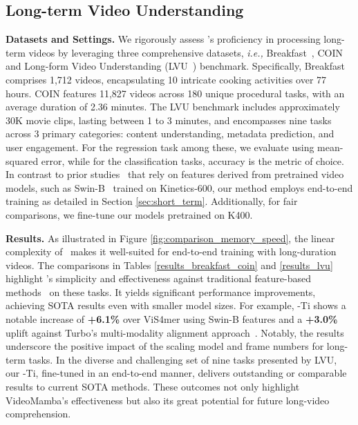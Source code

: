 





\subsection{Long-term Video Understanding}






\noindent\textbf{Datasets and Settings.} 
We rigorously assess \ModelName's proficiency in processing long-term videos by leveraging three comprehensive datasets,
\textit{i.e.,}
Breakfast~\cite{breakfast}, COIN~\cite{coin} and Long-form Video Understanding (LVU~\cite{lvu}) benchmark. 
Specifically,
Breakfast comprises 1,712 videos, 
encapsulating 10 intricate cooking activities over 77 hours. 
COIN features 11,827 videos across 180 unique procedural tasks, 
with an average duration of 2.36 minutes. 
The LVU benchmark includes approximately 30K movie clips, 
lasting between 1 to 3 minutes, 
and encompasses nine tasks across 3 primary categories: 
content understanding, metadata prediction, and user engagement. 
For the regression task among these, we evaluate using mean-squared error, 
while for the classification tasks, accuracy is the metric of choice.
In contrast to prior studies~\cite{distant,vis4mer} that rely on features derived from pretrained video models, 
such as Swin-B~\cite{swin} trained on Kinetics-600, 
our method employs end-to-end training as detailed in Section \ref{sec:short_term}. 
Additionally, 
for fair comparisons, 
we fine-tune our models pretrained on K400.

\vspace{0.05cm}
\noindent\textbf{Results.} 
As illustrated in Figure \ref{fig:comparison_memory_speed}, 
the linear complexity of \ModelName\  makes it well-suited for end-to-end training with long-duration videos.
The comparisons in Tables \ref{results_breakfast_coin} and \ref{results_lvu} highlight \ModelName's simplicity and effectiveness against traditional feature-based methods~\cite{vis4mer,distant} on these tasks. 
It yields significant performance improvements, 
achieving SOTA results even with smaller model sizes.
For example, 
\ModelName-Ti shows a notable increase of \textbf{+6.1\%} over ViS4mer using Swin-B features and a \textbf{+3.0\%} uplift against Turbo's multi-modality alignment approach~\cite{turbo}. 
Notably, 
the results underscore the positive impact of the scaling model and frame numbers for long-term tasks. 
In the diverse and challenging set of nine tasks presented by LVU, 
our \ModelName-Ti, fine-tuned in an end-to-end manner, 
delivers outstanding or comparable results to current SOTA methods. 
These outcomes not only highlight VideoMamba's effectiveness but also its great potential for future long-video comprehension.


